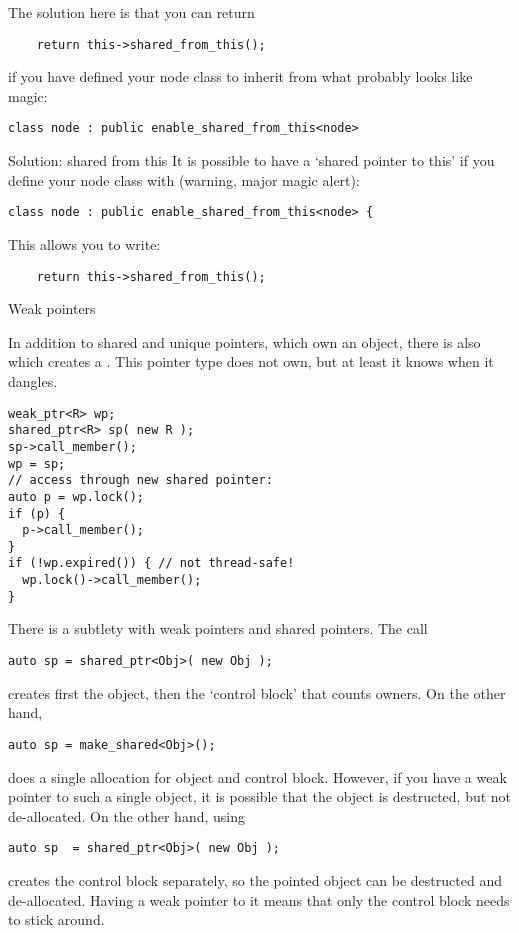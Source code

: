 The solution here is that you can return
\begin{lstlisting}
    return this->shared_from_this();
\end{lstlisting}
if you have defined your node class to inherit from what probably
looks like magic:
\begin{lstlisting}
class node : public enable_shared_from_this<node>
\end{lstlisting}

\begin{slide}{Solution: shared from this}
  \label{sl:share-ptr-node-from}
  It is possible to have a `shared pointer to this' if you
  define your node class with (warning, major magic alert):
\begin{lstlisting}
class node : public enable_shared_from_this<node> {
\end{lstlisting}
This allows you to write:
\begin{lstlisting}
    return this->shared_from_this();
\end{lstlisting}
\end{slide}

 {Weak pointers}
\label{sec:weak_ptr}

In addition to shared and unique pointers, which own an object, there
is also  which creates a
. This pointer type does not own, but
at least it knows when it dangles.

\begin{lstlisting}
weak_ptr<R> wp;
shared_ptr<R> sp( new R );
sp->call_member();
wp = sp;
// access through new shared pointer:
auto p = wp.lock();
if (p) {
  p->call_member();
}
if (!wp.expired()) { // not thread-safe!
  wp.lock()->call_member();
}
\end{lstlisting}

There is a subtlety with weak pointers and shared pointers. The call
\begin{lstlisting}
auto sp = shared_ptr<Obj>( new Obj );
\end{lstlisting}
creates first the object, then the `control block' that counts owners.
On the other hand,
\begin{lstlisting}
auto sp = make_shared<Obj>();
\end{lstlisting}
does a single allocation for object and control block. However, if you
have a weak pointer to such a single object, it is possible that the
object is destructed, but not de-allocated. On the other hand, using
\begin{lstlisting}
auto sp  = shared_ptr<Obj>( new Obj );
\end{lstlisting}
creates the control block separately, so the pointed object can be
destructed and de-allocated. Having a weak pointer to it means that only
the control block needs to stick around.

